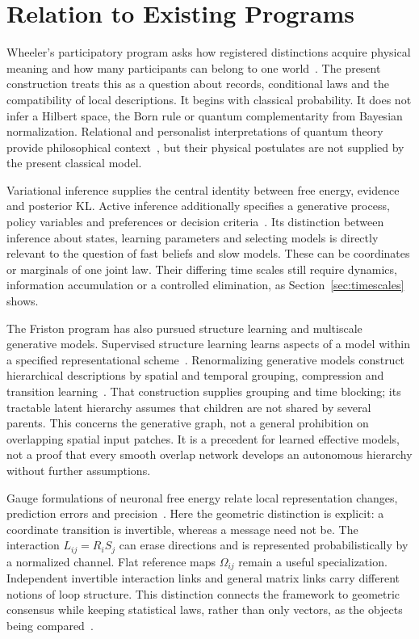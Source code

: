 \section{Relation to Existing Programs}\label{sec:related_work}

Wheeler's participatory program asks how registered distinctions acquire physical meaning and how many participants can belong to one world~\cite{Wheeler1983,Wheeler1990}. The present construction treats this as a question about records, conditional laws and the compatibility of local descriptions. It begins with classical probability. It does not infer a Hilbert space, the Born rule or quantum complementarity from Bayesian normalization. Relational and personalist interpretations of quantum theory provide philosophical context~\cite{Rovelli1996,Fuchs2014}, but their physical postulates are not supplied by the present classical model.

Variational inference supplies the central identity between free energy, evidence and posterior KL. Active inference additionally specifies a generative process, policy variables and preferences or decision criteria~\cite{Friston2010,friston2016active,DaCosta2020DiscreteSynthesis}. Its distinction between inference about states, learning parameters and selecting models is directly relevant to the question of fast beliefs and slow models. These can be coordinates or marginals of one joint law. Their differing time scales still require dynamics, information accumulation or a controlled elimination, as Section~\ref{sec:timescales} shows.

The Friston program has also pursued structure learning and multiscale generative models. Supervised structure learning learns aspects of a model within a specified representational scheme~\cite{Friston2024StructureLearning}. Renormalizing generative models construct hierarchical descriptions by spatial and temporal grouping, compression and transition learning~\cite{Friston2025PixelsPlanning}. That construction supplies grouping and time blocking; its tractable latent hierarchy assumes that children are not shared by several parents. This concerns the generative graph, not a general prohibition on overlapping spatial input patches. It is a precedent for learned effective models, not a proof that every smooth overlap network develops an autonomous hierarchy without further assumptions.

Gauge formulations of neuronal free energy relate local representation changes, prediction errors and precision~\cite{Sengupta2016NeuronalGauge}. Here the geometric distinction is explicit: a coordinate transition is invertible, whereas a message need not be. The interaction $L_{ij}=R_iS_j$ can erase directions and is represented probabilistically by a normalized channel. Flat reference maps $\Omega_{ij}$ remain a useful specialization. Independent invertible interaction links and general matrix links carry different notions of loop structure. This distinction connects the framework to geometric consensus while keeping statistical laws, rather than only vectors, as the objects being compared~\cite{SingerWu2012,HansenGhrist2021Discourse}.


